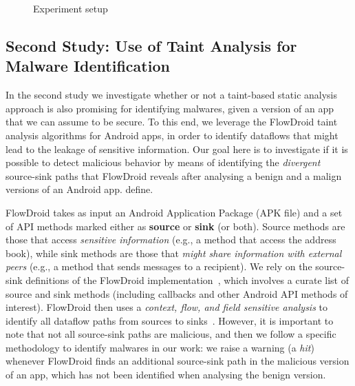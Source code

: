 \begin{figure}[ht]
   \label{Experiment setup}
   \caption{Experiment setup}
   \label{fig:setup}
 \end{figure}

\subsection{Second Study: Use of Taint Analysis for Malware Identification}\label{sec:set2}

In the second study 
we investigate whether or not a taint-based static analysis approach is also promising for
identifying malwares, given a version of an app that we can assume to be secure.
To this end, we leverage the FlowDroid
taint analysis algorithms for Android apps, in order to identify dataflows
that might lead to the leakage of sensitive information. Our
goal here is to investigate if it is possible to detect malicious
behavior by means of identifying the \emph{divergent} source-sink paths that FlowDroid reveals after
analysing a benign and a malign versions of an Android app.
define.

FlowDroid takes as input an Android Application Package (APK file) and
a set of API methods marked either as {\bf source}
or {\bf sink} (or both). Source methods are those that access \emph{sensitive information} (e.g.,
a method that access the address book), while sink methods are those 
that \emph{might share information with external peers} (e.g., a method that
sends messages to a recipient). We rely on the source-sink definitions
of the FlowDroid implementation~\cite{arzt:pldi-2014,rasthofer-source-sink},
which involves a curate list of source and sink methods (including callbacks and
other Android API methods of interest).
FlowDroid then uses a \emph{context, flow, and field
sensitive analysis} to identify all dataflow paths from sources to sinks~\cite{arzt:pldi-2014}.
However, it is important to note that not all source-sink paths are malicious, and then we
follow a specific methodology to identify malwares in our work: we raise a
warning (a \emph{hit}) whenever
FlowDroid finds an additional source-sink path in the malicious version of an app, which
has not been identified when analysing the benign version.

